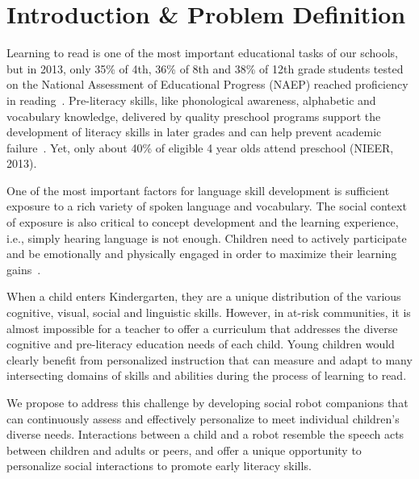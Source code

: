 


\section{Introduction \& Problem Definition}
 
Learning to read is one of the most important educational tasks of our schools, but in 2013, only 35\% of 4th, 36\% of 8th and 38\% of 12th grade students tested on the National Assessment of Educational Progress (NAEP) reached proficiency in reading~\cite{nces2015}. Pre-literacy skills, like phonological awareness, alphabetic and vocabulary knowledge, delivered by quality preschool programs support the development of literacy skills in later grades and can help prevent academic failure~\cite{hart1995meaningful,paez2007dual}. Yet, only about 40\% of eligible 4 year olds attend preschool (NIEER, 2013).

One of the most important factors for language skill development is sufficient exposure to a rich variety of spoken language and vocabulary\cite{asaridou2016pace}. The social context of exposure is also critical to concept development and the learning experience, i.e., simply hearing language is not enough. Children need to actively participate and be emotionally and physically engaged in order to maximize their learning gains~\cite{wells2000dialogic}. 

When a child enters Kindergarten, they are a unique distribution of the various cognitive, visual, social and linguistic skills. However, in at-risk communities, it is almost impossible for a teacher to offer a curriculum that addresses the diverse cognitive and pre-literacy education needs of each child. Young children would clearly benefit from personalized instruction that can measure and adapt to many intersecting domains of skills and abilities during the process of learning to read. 

We propose to address this challenge by developing social robot companions that can continuously assess and effectively personalize to meet individual children's diverse needs. Interactions between a child and a robot resemble the speech acts between children and adults or peers, and offer a unique opportunity to personalize social interactions to promote early literacy skills.

